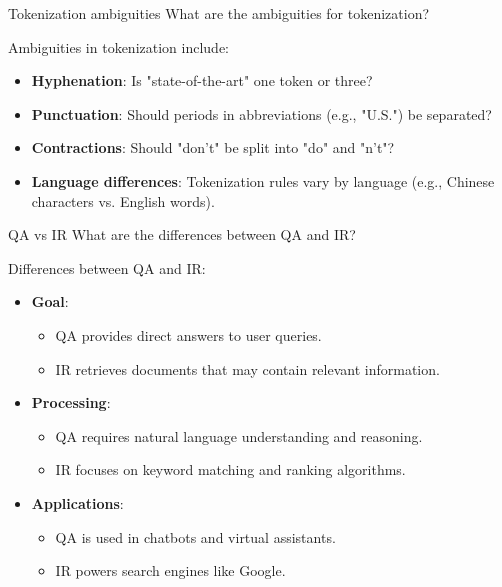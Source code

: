 \documentclass{article}
\begin{document}
\begin{exercise}{Tokenization ambiguities}
  What are the ambiguities for tokenization?

  \begin{solution}
    Ambiguities in tokenization include:
    \begin{itemize}
        \item \textbf{Hyphenation}: Is "state-of-the-art" one token or three?
        \item \textbf{Punctuation}: Should periods in abbreviations (e.g., "U.S.") be separated?
        \item \textbf{Contractions}: Should "don't" be split into "do" and "n't"?
        \item \textbf{Language differences}: Tokenization rules vary by language (e.g., Chinese characters vs. English words).
    \end{itemize}
  \end{solution}
\end{exercise}

\begin{exercise}{QA vs IR}
  What are the differences between QA and IR?

  \begin{solution}
    Differences between QA and IR:
    \begin{itemize}
        \item \textbf{Goal}:
        \begin{itemize}
            \item QA provides direct answers to user queries.
            \item IR retrieves documents that may contain relevant information.
        \end{itemize}
        \item \textbf{Processing}:
        \begin{itemize}
            \item QA requires natural language understanding and reasoning.
            \item IR focuses on keyword matching and ranking algorithms.
        \end{itemize}
        \item \textbf{Applications}:
        \begin{itemize}
            \item QA is used in chatbots and virtual assistants.
            \item IR powers search engines like Google.
        \end{itemize}
    \end{itemize}
  \end{solution}
\end{exercise}
\end{document}

